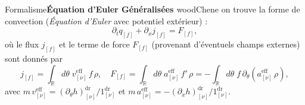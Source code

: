 \EncadreDeux
{Formalisme}{{\bf \textsf{Équation d'Euler Généralisées} \textsf{}}}{woodChene}{
on trouve la forme de convection (\emph{Équation d'Euler} avec potentiel extérieur) :
\begin{equation}\label{chap:GHD:eq.conserv.2}
    \partial_t q_{[f]} + \partial_x j_{[f]} = F_{[f]},
\end{equation}
où le flux $j_{[f]}$ et le terme de force $F_{[f]}$ (provenant d’éventuels champs externes) sont donnés par
\begin{equation}\label{chap:GHD:eq.conserv.2.1}
    j_{[f]} = \int_{\mathbb{R}} d\theta \;  v^{\mathrm{eff}}_{[\nu]} \, f \, \rho,
    \quad F_{[f]} =  \int_{\mathbb{R}} d\theta \;  a^{\mathrm{eff}}_{[\nu]} \, f' \, \rho = - \int_{\mathbb{R}} d\theta \;   f \, \partial_\theta \left ( a^{\mathrm{eff}}_{[\nu]} \,  \rho \right ),
\end{equation}
avec $m \, v^{\mathrm{eff}}_{[\nu]} = (\partial_\theta h )^{\mathrm{dr}}_{[\nu]}/1^{\mathrm{dr}}_{[\nu]}$ et $m \, a^{\mathrm{eff}}_{[\nu]} = -(\partial_x h )^{\mathrm{dr}}_{[\nu]}/1^{\mathrm{dr}}_{[\nu]}$.
}

